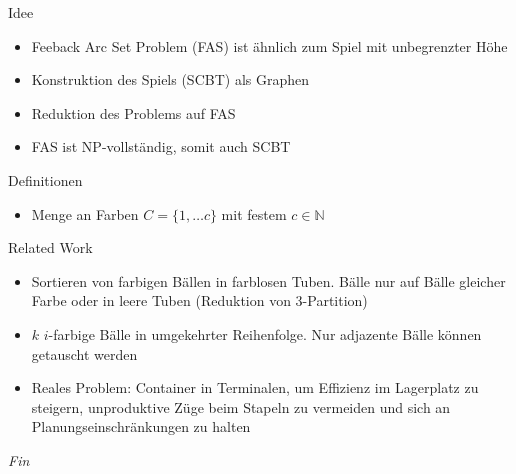 \documentclass{beamer}
\begin{document}
\begin{frame}{Idee}
	\begin{itemize}
		\item Feeback Arc Set Problem (FAS) ist ähnlich zum Spiel mit unbegrenzter Höhe
		\item Konstruktion des Spiels (SCBT) als Graphen 
		\item Reduktion des Problems auf FAS
		\item FAS ist NP-vollständig, somit auch SCBT
	\end{itemize}
\end{frame}

\begin{frame}{Definitionen}
	\begin{itemize}
		\item Menge an Farben $C=\{1,\dots c\}$ mit festem $c\in \mathbb{N}$
	\end{itemize}
\end{frame}

\begin{frame}{Related Work}
	\begin{itemize}
		\item Sortieren von farbigen Bällen in farblosen Tuben. Bälle nur auf Bälle gleicher Farbe oder in leere Tuben (Reduktion von 3-Partition)
		\item $k$ $i$-farbige Bälle in umgekehrter Reihenfolge. Nur adjazente Bälle können getauscht werden 
		\item Reales Problem: Container in Terminalen, um Effizienz im Lagerplatz zu steigern, unproduktive Züge beim Stapeln zu vermeiden und sich an Planungseinschränkungen zu halten 
	\end{itemize}
\end{frame}



\begin{frame}{}
  \centering \Huge
  \emph{Fin}
\end{frame}


	
    	
    	
    	
\end{document}
